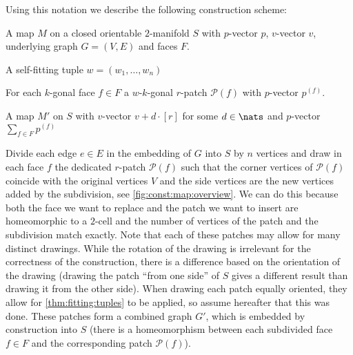 Using this notation we describe the following construction scheme:

\begin{construction}\label{const:map}
  \begin{cinput}
  \item A map $M$ on a closed orientable $2$-manifold $S$ with $p$-vector $p$, $v$-vector $v$, underlying graph $G = (V, E)$ and faces $F$. 
  \item A self-fitting tuple $w = (w_1, \dots, w_n)$
  \item For each $k$-gonal face $f \in F$ a $w$-$k$-gonal $r$-patch $\mathcal{P}(f)$ with $p$-vector $p^{(f)}$.
  \end{cinput}
  \begin{coutput}
    \item A map $M'$ on $S$ with $v$-vector $v + d \cdot [r]$ for some $d \in \nats$ and $p$-vector $\sum_{f \in F} p^{(f)}$
  \end{coutput} 
  \begin{cdescription} 
    Divide each edge $e \in E$ in the embedding of $G$ into $S$ by $n$ vertices and draw in each face $f$ the dedicated $r$-patch $\mathcal{P}(f)$ such that the corner vertices of $\mathcal{P}(f)$ coincide with the original vertices $V$ and the side vertices are the new vertices added by the subdivision, see \autoref{fig:const:map:overview}. We can do this because both the face we want to replace and the patch we want to insert are homeomorphic to a $2$-cell and the number of vertices of the patch and the subdivision match exactly. Note that each of these patches may allow for many distinct drawings. While the rotation of the drawing is irrelevant for the correctness of the construction, there is a difference based on the orientation of the drawing (drawing the patch “from one side” of $S$ gives a different result than drawing it from the other side). When drawing each patch equally oriented, they allow for \autoref{thm:fitting:tuples} to be applied, so assume hereafter that this was done. These patches form a combined graph $G'$, which is embedded by construction into $S$ (there is a homeomorphism between each subdivided face $f \in F$ and the corresponding patch $\mathcal{P}(f)$). 


\end{cdescription}
\end{construction}
